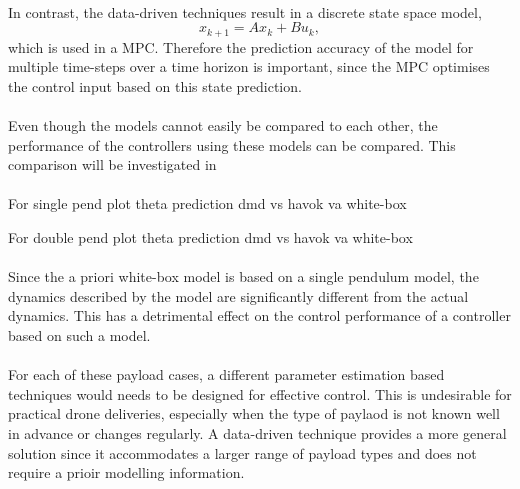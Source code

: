         \paragraph{}
        In contrast, the data-driven techniques result in a discrete state space model,
        \begin{equation}
            x_{k+1} = A x_k + B u_k ,
        \end{equation} 
        which is used in a MPC.
        Therefore the prediction accuracy of the model for multiple time-steps over a time horizon is important,
        since the MPC optimises the control input based on this state prediction.
        
        \paragraph{}
        Even though the models cannot easily be compared to each other, 
        the performance of the controllers using these models can be compared.
        This comparison will be investigated in %

        \paragraph{}
        For single pend
        plot theta prediction dmd vs havok va white-box

        For double pend
        plot theta prediction dmd vs havok va white-box

        \paragraph{}
        Since the a priori white-box model is based on a single pendulum model, 
        the dynamics described by the model are significantly different from the actual dynamics.
        This has a detrimental effect on the control performance of a controller based on such a model.
        
        

        \paragraph{}
        For each of these payload cases, a different parameter estimation based techniques would needs to be designed for effective control.
        This is undesirable for practical drone deliveries, especially when the type of paylaod is not known well in advance or changes regularly.
        A data-driven technique provides a more general solution since it accommodates a larger range of payload types and does not require a prioir modelling information.
        
